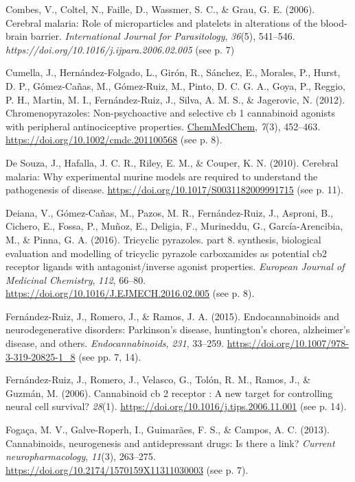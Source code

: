 \documentclass[empirical, authordate, issue]{jote-new-article}
\begin{document}
Combes, V., Coltel, N., Faille, D., Wassmer, S. C., \& Grau, G. E. (2006). Cerebral malaria: Role of microparticles and platelets in alterations of the blood-brain barrier. \emph{International Journal for Parasitology}, \emph{36}(5), 541–546. \emph{https://doi.org/10.1016/j.ijpara.2006.02.005} (see p. 7)

Cumella, J., Hernández-Folgado, L., Girón, R., Sánchez, E., Morales, P., Hurst, D. P., Gómez-Cañas, M., Gómez-Ruiz, M., Pinto, D. C. G. A., Goya, P., Reggio, P. H., Martin, M. I., Fernández-Ruiz, J., Silva, A. M. S., \& Jagerovic, N. (2012). Chromenopyrazoles: Non-psychoactive and selective cb 1 cannabinoid agonists with peripheral antinociceptive properties. \url{ChemMedChem}, \emph{7}(3), 452–463. \url{https://doi.org/10.1002/cmdc.201100568} (see p. 8).

De Souza, J., Hafalla, J. C. R., Riley, E. M., \& Couper, K. N. (2010). Cerebral malaria: Why experimental murine models are required to understand the pathogenesis of disease. \url{https://doi.org/10.1017/S0031182009991715} (see p. 11).

Deiana, V., Gómez-Cañas, M., Pazos, M. R., Fernández-Ruiz, J., Asproni, B., Cichero, E., Fossa, P., Muñoz, E., Deligia, F., Murineddu, G., García-Arencibia, M., \& Pinna, G. A. (2016). Tricyclic pyrazoles. part 8. synthesis, biological evaluation and modelling of tricyclic pyrazole carboxamides as potential cb2 receptor ligands with antagonist/inverse agonist properties. \emph{European Journal of Medicinal Chemistry}, \emph{112}, 66–80. \url{https://doi.org/10.1016/J.EJMECH.2016.02.005} (see p. 8).

Fernández-Ruiz, J., Romero, J., \& Ramos, J. A. (2015). Endocannabinoids and neurodegenerative disorders: Parkinson’s disease, huntington’s chorea, alzheimer’s disease, and others. \emph{Endocannabinoids}, \emph{231}, 33–259. \url{https://doi.org/10.1007/978-3-319-20825-1\_8} (see pp. 7, 14).

Fernández-Ruiz, J., Romero, J., Velasco, G., Tolón, R. M., Ramos, J., \& Guzmán, M. (2006). Cannabinoid cb 2 receptor : A new target for controlling neural cell survival? \emph{28}(1). \url{https://doi.org/10.1016/j.tips.2006.11.001} (see p. 14).

Fogaça, M. V., Galve-Roperh, I., Guimarães, F. S., \& Campos, A. C. (2013). Cannabinoids, neurogenesis and antidepressant drugs: Is there a link? \emph{Current neuropharmacology}, \emph{11}(3), 263–275. \url{https://doi.org/10.2174/1570159X11311030003} (see p. 7).
\end{document}
